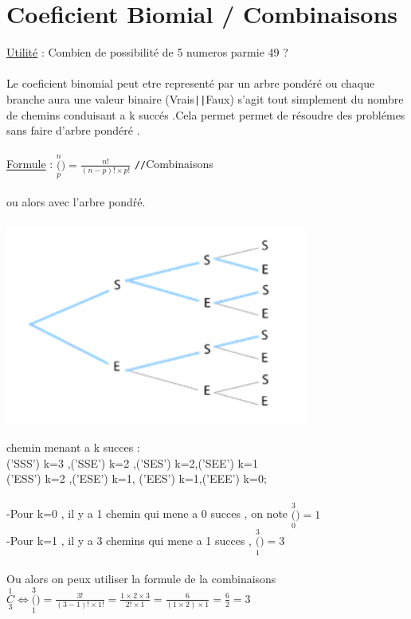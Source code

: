 \documentclass[a4paper,8pt,openany]{book}
\begin{document}
\section{Coeficient Biomial / Combinaisons}
\underline{Utilit\'e} : Combien de possibilit\'e de 5 numeros parmie 49 ?\\
\\
Le coeficient binomial peut etre represent\'e par un arbre pond\'er\'e ou chaque branche aura une valeur binaire (Vrais\verb!||!Faux) s'agit tout simplement du nombre de chemins conduisant a k succ\'es .Cela permet permet de r\'esoudre des probl\'emes sans faire d'arbre pondéré .\\
\\
\underline{Formule} : $(\limits_p^n) = \frac{n!}{(n-p)!\times p!}$ \verb!//!Combinaisons \\
\\
ou alors avec l'arbre pond\'r\'e.\\
\\
\includegraphics[width=0.75\textwidth,center]{coef_binomial.png}

chemin menant a k succes :\\ 
('SSS') k=3 ,('SSE') k=2 ,('SES') k=2,('SEE') k=1\\
('ESS') k=2 ,('ESE') k=1, ('EES') k=1,('EEE') k=0;\\
\\
-Pour k=0 , il y a 1 chemin qui mene a 0 succes , on note $(\limits^3_0)=1$\\
-Pour k=1 , il y a 3 chemins qui mene a 1 succes , $(\limits^3_1)=3$ \\
\\
Ou alors on peux utiliser la formule de la combinaisons $C\limits_3^1  \Leftrightarrow (\limits^3_1)=\frac{3!}{(3-1)!\times 1!}=\frac{1\times 2\times 3}{2!\times 1}=\frac{6}{(1\times 2)\times 1}=\frac{6}{2}=3$\\
\end{document}
